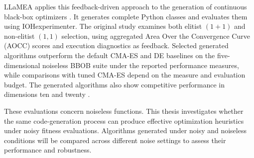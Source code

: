 LLaMEA applies this feedback-driven approach to the generation of
continuous black-box optimizers \cite{LLaMEA2024}. It generates complete
Python classes and evaluates them using IOHexperimenter. The original
study examines both elitist $(1+1)$ and non-elitist $(1,1)$ selection,
using aggregated Area Over the Convergence Curve (AOCC) scores and
execution diagnostics as feedback. Selected generated algorithms
outperform the default CMA-ES and DE baselines on the five-dimensional
noiseless BBOB suite under the reported performance measures, while
comparisons with tuned CMA-ES depend on the measure and evaluation
budget. The generated algorithms also show competitive performance
in dimensions ten and twenty \cite{LLaMEA2024}.

These evaluations concern noiseless functions. This thesis investigates
whether the same code-generation process can produce effective
optimization heuristics under noisy fitness evaluations. Algorithms
generated under noisy and noiseless conditions will be compared across
different noise settings to assess their performance and robustness.